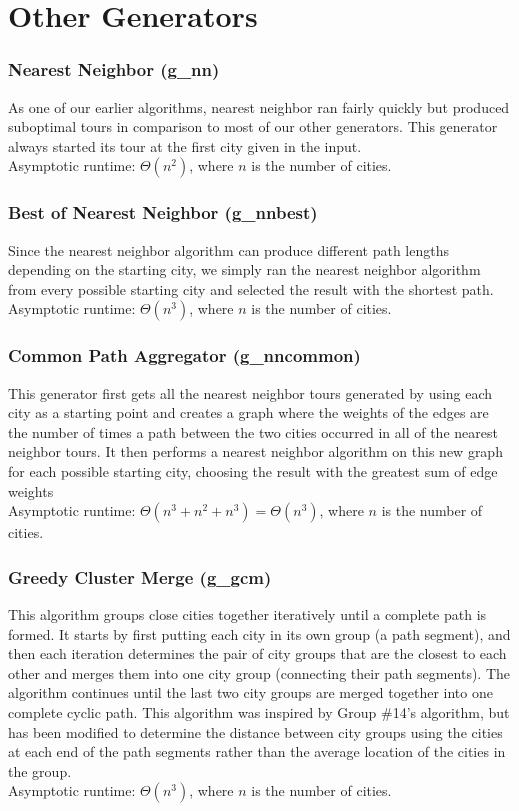 \documentclass{article}
\begin{document}
\part*{Other Generators}

\section*{Nearest Neighbor (g\_nn)}

As one of our earlier algorithms, nearest neighbor ran fairly quickly but
produced suboptimal tours in comparison to most of our other generators. This
generator always started its tour at the first city given in the
input.\\Asymptotic runtime: $\Theta (n^2)$, where $n$ is the number of cities.

\section*{Best of Nearest Neighbor (g\_nnbest)}

Since the nearest neighbor algorithm can produce different path lengths
depending on the starting city, we simply ran the nearest neighbor algorithm
from every possible starting city and selected the result with the shortest
path.\\Asymptotic runtime: $\Theta (n^3)$, where $n$ is the number of cities.

\section*{Common Path Aggregator (g\_nncommon)}

This generator first gets all the nearest neighbor tours generated by using
each city as a starting point and creates a graph where the weights of the
edges are the number of times a path between the two cities occurred in all of
the nearest neighbor tours. It then performs a nearest neighbor algorithm on
this new graph for each possible starting city, choosing the result with the
greatest sum of edge weights \\Asymptotic runtime: $\Theta (n^3 + n^2 + n^3) =
\Theta (n^3)$, where $n$ is the number of cities.

\section*{Greedy Cluster Merge (g\_gcm)}

This algorithm groups close cities together iteratively until a complete path
is formed. It starts by first putting each city in its own group (a path
segment), and then each iteration determines the pair of city groups that are
the closest to each other and merges them into one city group (connecting their
path segments). The algorithm continues until the last two city groups are
merged together into one complete cyclic path. This algorithm was inspired by
Group \#14's algorithm, but has been modified to determine the distance between
city groups using the cities at each end of the path segments rather than the
average location of the cities in the group.\\Asymptotic runtime: $\Theta
(n^3)$, where $n$ is the number of cities.
\end{document}
